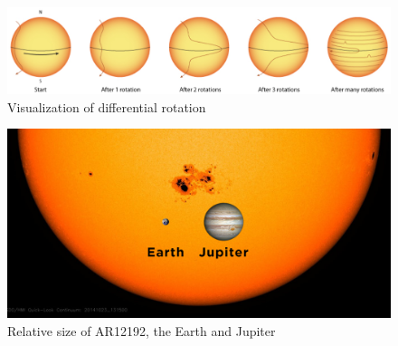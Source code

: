\begin{figure}[b]
    \centering
    \includegraphics[width=\textwidth]{./pictures/diffrot}
    \caption{Visualization of differential rotation}
    \label{fig:diffrot}
\end{figure}
\begin{figure}[t]
    \centering
    \includegraphics[width=\textwidth]{./pictures/AR12192-jup-earth}
    \caption{Relative size of AR12192, the Earth and Jupiter}
    \label{fig:AR12192-comp}
\end{figure}
